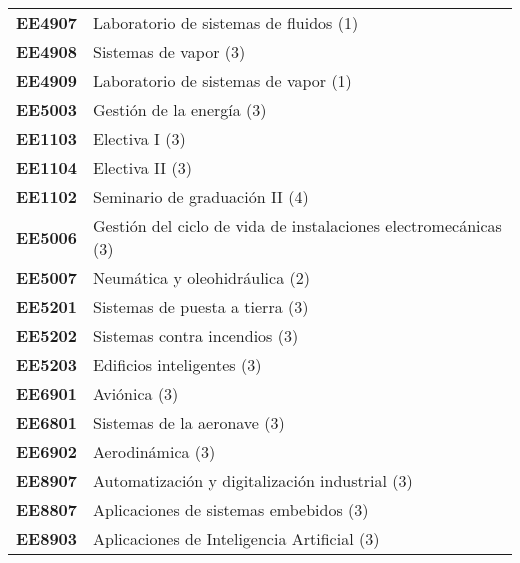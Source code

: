 \documentclass[letterpaper]{article}%
\begin{document}
\begin{tabularx}{\textwidth}{p{1.5cm}p{10cm}}
\textbf{EE4907}&Laboratorio de sistemas de fluidos (1)\\%
\textbf{EE4908}&Sistemas de vapor (3)\\%
\textbf{EE4909}&Laboratorio de sistemas de vapor (1)\\%
\textbf{EE5003}&Gestión de la energía (3)\\%
\textbf{EE1103}&Electiva I (3)\\%
\textbf{EE1104}&Electiva II (3)\\%
\textbf{EE1102}&Seminario de graduación II (4)\\%
\textbf{EE5006}&Gestión del ciclo de vida de instalaciones electromecánicas (3)\\%
\textbf{EE5007}&Neumática y oleohidráulica (2)\\%
\textbf{EE5201}&Sistemas de puesta a tierra (3)\\%
\textbf{EE5202}&Sistemas contra incendios (3)\\%
\textbf{EE5203}&Edificios inteligentes (3)\\%
\textbf{EE6901}&Aviónica (3)\\%
\textbf{EE6801}&Sistemas de la aeronave (3)\\%
\textbf{EE6902}&Aerodinámica (3)\\%
\textbf{EE8907}&Automatización y digitalización industrial (3)\\%
\textbf{EE8807}&Aplicaciones de sistemas embebidos (3)\\%
\textbf{EE8903}&Aplicaciones de Inteligencia Artificial (3)\\%
\end{tabularx}

%
\end{document}
